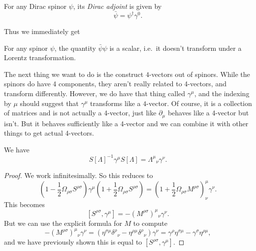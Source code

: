 \documentclass[a4paper]{article}
\begin{document}
\begin{defi}
  For any Dirac spinor $\psi$, its \emph{Dirac adjoint} is given by
  \[
    \bar\psi = \psi^\dagger \gamma^0.
  \]
\end{defi}
Thus we immediately get
\begin{cor}
  For any spinor $\psi$, the quantity $\bar \psi \psi$ is a scalar, i.e.\ it doesn't transform under a Lorentz transformation.
\end{cor}

The next thing we want to do is the construct $4$-vectors out of spinors. While the spinors do have 4 components, they aren't really related to 4-vectors, and transform differently. However, we do have that thing called $\gamma^\mu$, and the indexing by $\mu$ should suggest that $\gamma^\mu$ transforms like a $4$-vector. Of course, it is a collection of matrices and is not actually a 4-vector, just like $\partial_\mu$ behaves like a 4-vector but isn't. But it behaves sufficiently like a 4-vector and we can combine it with other things to get actual 4-vectors.


\begin{prop}
  We have
  \[
    S[\Lambda]^{-1} \gamma^\mu S[\Lambda] = \Lambda^\mu\!_\nu \gamma^\nu.
  \]
\end{prop}

\begin{proof}
  We work infinitesimally. So this reduces to
  \[
    \left(1 - \frac{1}{2} \Omega_{\rho\sigma} S^{\rho\sigma}\right) \gamma^\mu \left(1 + \frac{1}{2} \Omega_{\rho\sigma}S^{\rho\sigma}\right) = \left(1 + \frac{1}{2}\Omega_{\rho\sigma}M^{\rho\sigma}\right)^\mu_\nu\gamma^\nu.
  \]
  This becomes
  \[
    [S^{\rho\sigma}, \gamma^\mu] = -(M^{\rho\sigma})^\mu\!_\nu\gamma^\nu.
  \]
  But we can use the explicit formula for $M$ to compute
  \[
    -(M^{\rho\sigma})^\mu\!_\nu \gamma^\nu = (\eta^{\sigma\mu} \delta^\rho\!_\nu - \eta^{\rho\mu}\delta^\rho\!_\nu) \gamma^\nu = \gamma^\rho\eta^{\sigma\mu} - \gamma^\sigma\eta^{\rho\mu},
  \]
  and we have previously shown this is equal to $[S^{\rho\sigma}, \gamma^\mu]$.
\end{proof}
\end{document}
